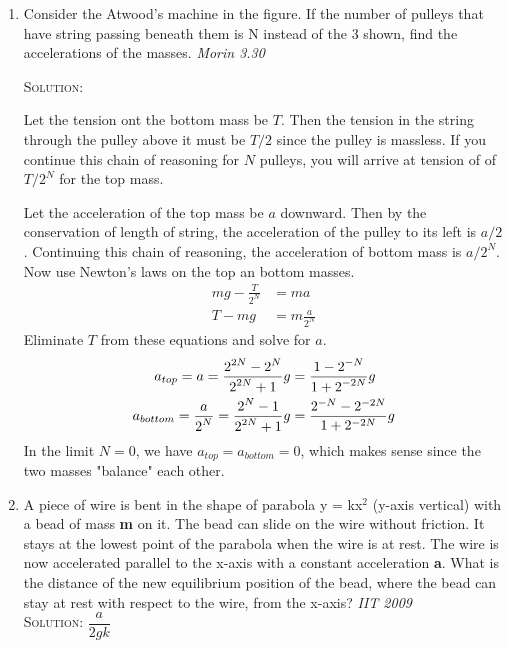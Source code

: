 \begin{enumerate}
\item Consider the Atwood's machine in the figure. If the number of pulleys that have string passing beneath them is N instead of the 3 shown, find the accelerations of the masses. \hfill \textsl{Morin 3.30}
\begin{figure}[hbt]
    \centering
    
\end{figure}

\textsc{Solution:}

Let the tension ont the bottom mass be $T$. Then the tension in the string through the pulley above it must be $T/2$ since the pulley is massless. If you continue this chain of reasoning for $N$ pulleys, you will arrive at tension of of $T/2^N$ for the top mass.

Let the acceleration of the top mass be $a$ downward. Then by the conservation of length of string, the acceleration of the pulley to its left is $a/2$. Continuing this chain of reasoning, the acceleration of bottom mass is $a/2^N$. Now use Newton's laws on the top an bottom masses.
\begin{align}
    mg - \frac{T}{2^N} &= ma \\
    T - mg &= m\frac{a}{2^N}
\end{align}
Eliminate $T$ from these equations and solve for $a$.
\begin{align*}
    a_{top} = a = \frac{\displaystyle 2^{2N} - 2^N}{\displaystyle 2^{2N} + 1}g &= \frac{\displaystyle 1 - 2^{-N}}{\displaystyle 1 + 2^{-2N}}g \\
    a_{bottom} = \frac{\displaystyle a}{\displaystyle 2^N} = \frac{\displaystyle 2^N - 1}{\displaystyle 2^{2N} + 1}g &= \frac{2^{-N} - 2^{-2N}}{1 + 2^{-2N}}g
\end{align*}
In the limit $N=0$, we have $a_{top} = a_{bottom} = 0$, which makes sense since the two masses "balance" each other.

\item A piece of wire is bent in the shape of parabola y = kx$^2$ (y-axis vertical) with a bead of mass \textbf{m} on it. The bead can slide on the wire without friction. It stays at the lowest point of the parabola when the wire is at rest. The wire is now accelerated parallel to the x-axis with a constant acceleration \textbf{a}. What is the distance of the new equilibrium position of the bead, where the bead can stay at rest with respect to the wire, from the x-axis? \hfill \textsl{IIT 2009}\\
\textsc{Solution:} $\dfrac{a}{2gk}$
\end{enumerate}

